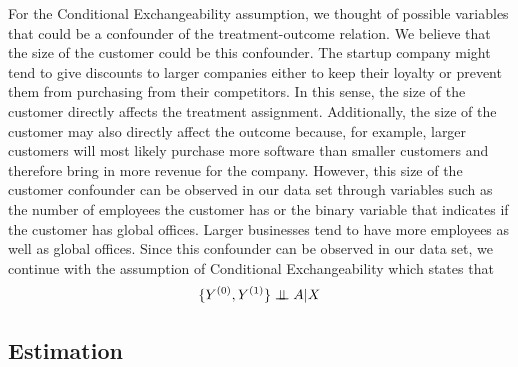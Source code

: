 \documentclass{article}
\newcommand{\independent}{\perp\mkern-9.5mu\perp}
\begin{document}
For the Conditional Exchangeability assumption, we thought of possible variables that could be a confounder of the treatment-outcome relation. We believe that the size of the customer could be this confounder. The startup company might tend to give discounts to larger companies either to keep their loyalty or prevent them from purchasing from their competitors. In this sense, the size of the customer directly affects the treatment assignment. Additionally, the size of the customer may also directly affect the outcome because, for example, larger customers will most likely purchase more software than smaller customers and therefore bring in more revenue for the company. However, this size of the customer confounder can be observed in our data set through variables such as the number of employees the customer has or the binary variable that indicates if the customer has global offices. Larger businesses tend to have more employees as well as global offices. Since this confounder can be observed in our data set, we continue with the assumption of Conditional Exchangeability which states that
\[
\{Y^{(0)}, Y^{(1)}\} \independent{A|X}
\]
\subsection{Estimation}
\end{document}
